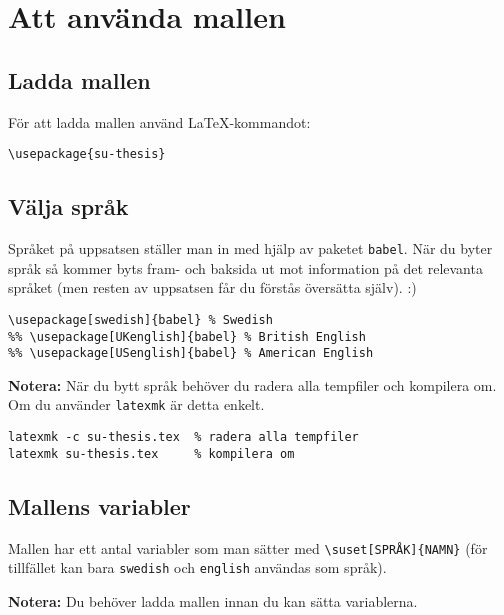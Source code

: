 
\section{Att använda mallen}
\label{mallen}


\subsection{Ladda mallen}
\label{ladda}

För att ladda mallen använd \LaTeX-kommandot:

\begin{verbatim}
\usepackage{su-thesis}
\end{verbatim}


\subsection{Välja språk}
\label{sprak}

\noindent Språket på uppsatsen ställer man in med hjälp av paketet
\texttt{babel}. När du byter språk så kommer byts fram- och baksida ut mot
information på det relevanta språket (men resten av uppsatsen får du förstås
översätta själv). :)

\begin{verbatim}
\usepackage[swedish]{babel} % Swedish
%% \usepackage[UKenglish]{babel} % British English
%% \usepackage[USenglish]{babel} % American English
\end{verbatim}

\noindent\textbf{Notera:} När du bytt språk behöver du radera alla tempfiler
och kompilera om. Om du använder \texttt{latexmk} är detta enkelt.

\begin{verbatim}
latexmk -c su-thesis.tex  % radera alla tempfiler
latexmk su-thesis.tex     % kompilera om
\end{verbatim}


\subsection{Mallens variabler}
\label{variabler}

Mallen har ett antal variabler som man sätter med \verb|\suset[SPRÅK]{NAMN}|
(för tillfället kan bara \texttt{swedish} och \texttt{english} användas som
språk).

\textbf{Notera:} Du behöver ladda mallen innan du kan sätta variablerna.

